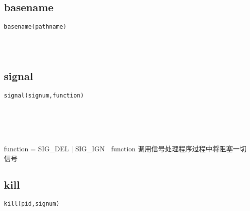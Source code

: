 \documentclass[10pt,a4paper]{article}
\begin{document}
\subsection{basename}
\begin{spacing}{2.0}
\lstset{language=C,numbers=none}
\begin{lstlisting}
basename(pathname)
\end{lstlisting}
{\large\color[rgb]{0.2,0.4,0.6}{pathname:}}
\paragraph{ \ \ }
\end{spacing}

\section{\color[rgb]{0.2,0.4,0.6}{信号}}
\subsection{signal}
\begin{spacing}{2.0}
\lstset{language=C,numbers=none}
\begin{lstlisting}
signal(signum,function)
\end{lstlisting}
{\large\color[rgb]{0.2,0.4,0.6}{signum:}} \\
{\large\color[rgb]{0.2,0.4,0.6}{function:}}
\paragraph{ \ \ }function = SIG\_DEL | SIG\_IGN | function 调用信号处理程序过程中将阻塞一切信号
\end{spacing}

\subsection{kill}
\begin{spacing}{2.0}
\lstset{language=C,numbers=none}
\begin{lstlisting}
kill(pid,signum)
\end{lstlisting}
{\large\color[rgb]{0.2,0.4,0.6}{pid:}} \\
{\large\color[rgb]{0.2,0.4,0.6}{signum:}}
\paragraph{ \ \ }
\end{spacing}
\end{document}
